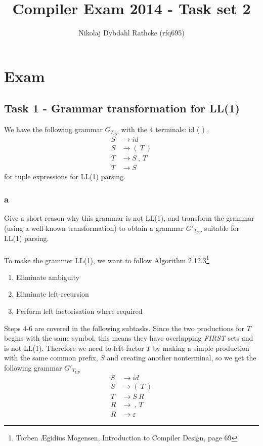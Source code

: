 \documentclass[12pt]{article}
\title{Compiler Exam 2014 - Task set 2}
\author{Nikolaj Dybdahl Rathcke (rfq695)}
\begin{document}
\maketitle
\newpage
\tableofcontents 
\newpage
\section{Exam}
\subsection{Task 1 - Grammar transformation for LL(1)}
We have the following grammar $G_{T_{UP}}$ with the 4 terminals: id ( ) ,
\begin{align*}
S &\rightarrow id \\
S &\rightarrow (\:T\:) \\
T &\rightarrow S\:,\:T \\
T &\rightarrow S
\end{align*}
for tuple expressions for LL(1) parsing.
\subsubsection{a}
Give a short reason why this grammar is not LL(1), and transform the grammar (using a well-known transformation) to obtain a grammar $G'_{T_{UP}}$ suitable for LL(1) parsing.\\
\\
To make the grammer LL(1), we want to follow Algorithm 2.12.3\footnote{Torben Ægidius Mogensen, Introduction to Compiler Design, page 69}
\begin{enumerate}
\item Eliminate ambiguity
\item Eliminate left-recursion
\item Perform left factorisation where required
\end{enumerate}
Steps 4-6 are covered in the following subtasks. Since the two productions for $T$ begins with the same symbol, this means they have overlapping \textit{FIRST} sets and is not LL(1). Therefore we need to left-factor $T$ by making a simple production with the same common prefix, $S$ and creating another nonterminal, so we get the following grammar $G'_{T_{UP}}$
\begin{align*}
S &\rightarrow id \\
S &\rightarrow (\:T\:) \\
T &\rightarrow S\:R \\
R &\rightarrow \:,\:T \\
R &\rightarrow \varepsilon
\end{align*}
\end{document}
